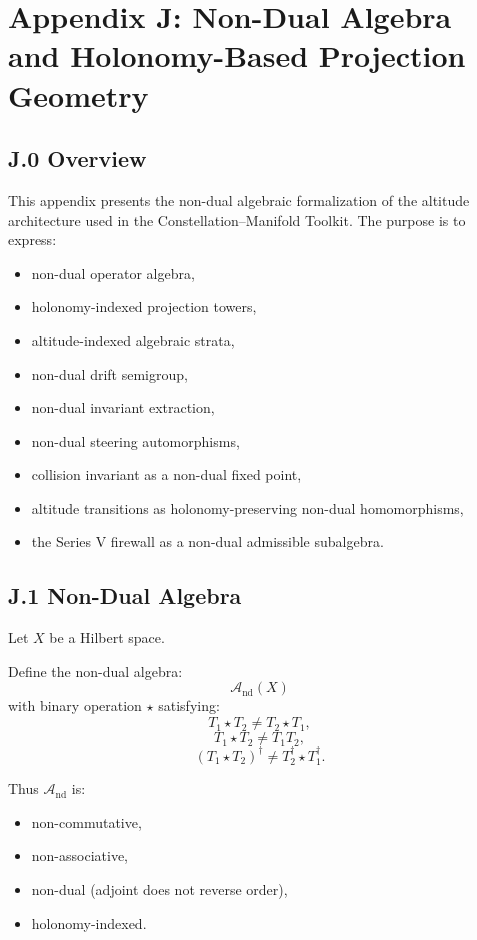 \appendix
\section*{Appendix J: Non-Dual Algebra and Holonomy-Based Projection Geometry}

\subsection*{J.0 Overview}

This appendix presents the non-dual algebraic formalization of the
altitude architecture used in the Constellation–Manifold Toolkit.
The purpose is to express:
\begin{itemize}
    \item non-dual operator algebra,
    \item holonomy-indexed projection towers,
    \item altitude-indexed algebraic strata,
    \item non-dual drift semigroup,
    \item non-dual invariant extraction,
    \item non-dual steering automorphisms,
    \item collision invariant as a non-dual fixed point,
    \item altitude transitions as holonomy-preserving non-dual homomorphisms,
    \item the Series V firewall as a non-dual admissible subalgebra.
\end{itemize}

\subsection*{J.1 Non-Dual Algebra}

Let $X$ be a Hilbert space.

Define the non-dual algebra:
\[
\mathcal{A}_{\mathrm{nd}}(X)
\]
with binary operation $\star$ satisfying:
\[
T_1 \star T_2 \neq T_2 \star T_1,
\]
\[
T_1 \star T_2 \neq T_1 T_2,
\]
\[
(T_1 \star T_2)^\dagger \neq T_2^\dagger \star T_1^\dagger.
\]

Thus $\mathcal{A}_{\mathrm{nd}}$ is:
\begin{itemize}
    \item non-commutative,
    \item non-associative,
    \item non-dual (adjoint does not reverse order),
    \item holonomy-indexed.
\end{itemize}

